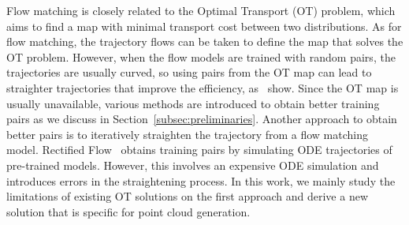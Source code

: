 Flow matching is closely related to the Optimal Transport (OT) problem, which aims to find a map with minimal transport cost between two distributions.
%
As for flow matching, the trajectory flows can be taken to define the map that solves the OT problem.
%
However, when the flow models are trained with random pairs, the trajectories are usually curved, so using pairs from the OT map can lead to straighter trajectories that improve the efficiency, as~\citet{pooladian2023multisample,tong2023improving} show.
%
Since the OT map is usually unavailable, various methods are introduced to obtain better training pairs as we discuss in Section~\ref{subsec:preliminaries}.
%
%
%
Another approach to obtain better pairs is to iteratively straighten the trajectory from a flow matching model.
%
Rectified Flow~\cite{liu2022flow} obtains training pairs by simulating ODE trajectories of pre-trained models.
%
However, this involves an expensive ODE simulation and introduces errors in the straightening process.
%
In this work, we mainly study the limitations of existing OT solutions on the first approach and derive a new solution that is specific for point cloud generation.


